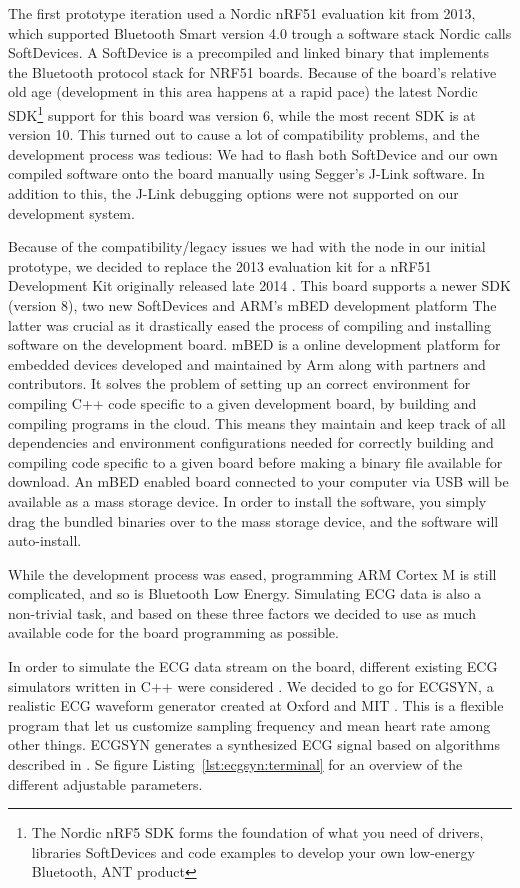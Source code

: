 The first prototype iteration used a Nordic nRF51 evaluation kit from 2013, which supported Bluetooth Smart version 4.0 trough a software stack Nordic calls SoftDevices. A SoftDevice is a precompiled and linked binary that implements the Bluetooth protocol stack for NRF51 boards. Because of the board's relative old age (development in this area happens at a rapid pace) the latest Nordic SDK\footnote{The Nordic nRF5 SDK forms the foundation of what you need of drivers, libraries SoftDevices and code examples to develop your own low-energy Bluetooth, ANT product} support for this board was version 6, while the most recent SDK is at version 10. This turned out to cause a lot of compatibility problems, and the development process was tedious: We had to flash both SoftDevice and our own compiled software onto the board manually using Segger's J-Link software. In addition to this, the J-Link debugging options were not supported on our development system.

Because of the compatibility/legacy issues we had with the node in our initial prototype, we decided to replace the 2013 evaluation kit for a nRF51 Development Kit originally released late 2014 \cite{newRef:53}. This board supports a newer SDK (version 8), two new SoftDevices and ARM's mBED development platform \cite{newRef:54} The latter was crucial as it drastically eased the process of compiling and installing software on the development board. mBED is a online development platform for embedded devices developed and maintained by Arm \cite{newRef:55} along with partners and contributors. It solves the problem of setting up an correct environment for compiling C++ code specific to a given development board, by building and compiling programs in the cloud. This means they maintain and keep track of all dependencies and environment configurations needed for correctly building and compiling code specific to a given board before making a binary file available for download. An mBED enabled board connected to your computer via USB will be available as a mass storage device. In order to install the software, you simply drag the bundled binaries over to the mass storage device, and the software will auto-install. 

While the development process was eased, programming ARM Cortex M is still complicated, and so is Bluetooth Low Energy. Simulating ECG data is also a non-trivial task, and based on these three factors we decided to use as much available code for the board programming as possible.

In order to simulate the ECG data stream on the board, different existing ECG simulators written in C++ were considered \cite{newRef:56, newRef:56:1, newRef:56:2}. We decided to go for ECGSYN, a realistic ECG waveform generator created at Oxford and MIT \cite{newRef:56:2}. This is a flexible program that let us customize sampling frequency and mean heart rate among other things. ECGSYN generates a synthesized ECG signal based on algorithms described in \cite{newRef:58}. Se figure Listing~\ref{lst:ecgsyn:terminal} for an overview of the different adjustable parameters.

